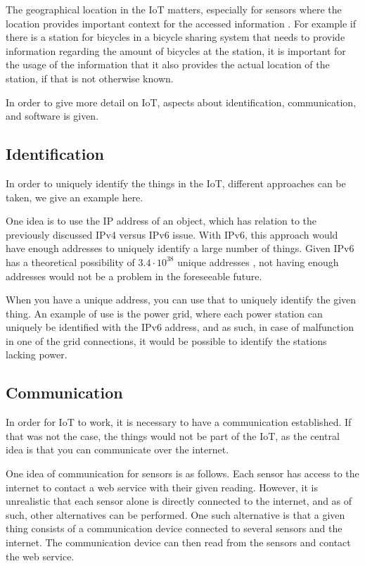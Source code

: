 The geographical location in the IoT matters, especially for sensors where the location provides important context for the accessed information \citep{misc:locationMatters}.
For example if there is a station for bicycles in a bicycle sharing system that needs to provide information regarding the amount of bicycles at the station, it is important for the usage of the information that it also provides the actual location of the station, if that is not otherwise known.

In order to give more detail on IoT, aspects about identification, communication, and software is given.

\subsection{Identification}
In order to uniquely identify the things in the IoT, different approaches can be taken, we give an example here.

One idea is to use the IP address of an object, which has relation to the previously discussed IPv4 versus IPv6 issue.
With IPv6, this approach would have enough addresses to uniquely identify a large number of things.
Given IPv6 has a theoretical possibility of $3.4 \cdot 10^{38}$ unique addresses \citep{misc:ipv6}, not having enough addresses would not be a problem in the foreseeable future.

When you have a unique address, you can use that to uniquely identify the given thing.
An example of use is the power grid, where each power station can uniquely be identified with the IPv6 address, and as such, in case of malfunction in one of the grid connections, it would be possible to identify the stations lacking power.

\subsection{Communication}
In order for IoT to work, it is necessary to have a communication established.
If that was not the case, the things would not be part of the IoT, as the central idea is that you can communicate over the internet.

One idea of communication for sensors is as follows.
Each sensor has access to the internet to contact a web service with their given reading.
However, it is unrealistic that each sensor alone is directly connected to the internet, and as of such, other alternatives can be performed.
One such alternative is that a given thing consists of a communication device connected to several sensors and the internet.
The communication device can then read from the sensors and contact the web service.

